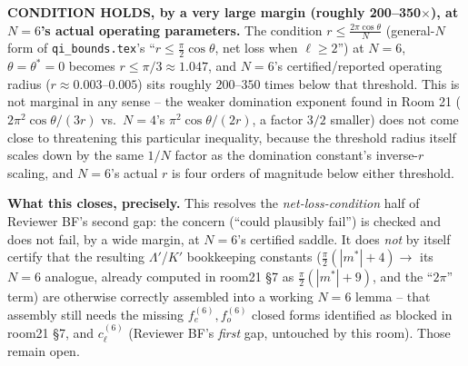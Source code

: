 \documentclass[11pt]{article}
\begin{document}
\textbf{CONDITION HOLDS, by a very large margin (roughly 200--350$\times$), at $N=6$'s actual
operating parameters.} The condition $r\le\frac{2\pi\cos\theta}N$ (general-$N$ form of
\texttt{qi\_bounds.tex}'s ``$r\le\frac\pi2\cos\theta$, net loss when $\ell\ge2$'') at $N=6$,
$\theta=\theta^*=0$ becomes $r\le\pi/3\approx1.047$, and $N=6$'s certified/reported operating
radius ($r\approx0.003$--$0.005$) sits roughly $200$--$350$ times below that threshold. This is
not marginal in any sense -- the weaker domination exponent found in Room 21
($2\pi^2\cos\theta/(3r)$ vs.\ $N=4$'s $\pi^2\cos\theta/(2r)$, a factor $3/2$ smaller) does not
come close to threatening this particular inequality, because the threshold radius itself scales
down by the same $1/N$ factor as the domination constant's inverse-$r$ scaling, and $N=6$'s actual
$r$ is four orders of magnitude below either threshold.

\textbf{What this closes, precisely.} This resolves the \emph{net-loss-condition} half of
Reviewer BF's second gap: the concern (``could plausibly fail'') is checked and does not fail, by
a wide margin, at $N=6$'s certified saddle. It does \emph{not} by itself certify that the resulting
$\Lambda'$/$K'$ bookkeeping constants ($\frac\pi2(|m^*|+4)\to$ its $N=6$ analogue, already computed
in room21 \S7 as $\frac\pi2(|m^*|+9)$, and the ``$2\pi$'' term) are otherwise correctly assembled
into a working $N=6$ lemma -- that assembly still needs the missing $f_e^{(6)},f_o^{(6)}$ closed
forms identified as blocked in room21 \S7, and $c_\ell^{(6)}$ (Reviewer BF's \emph{first} gap,
untouched by this room). Those remain open.
\end{document}
